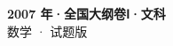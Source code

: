 \documentclass[zihao=-4, a4paper]{ctexart}
\begin{document}
\begin{center}
  {\Large\bfseries 2007 年·全国大纲卷Ⅰ·文科}\\[4pt]
  {\large 数学 · 试题版}
\end{center}
\medskip
{}

\end{document}
